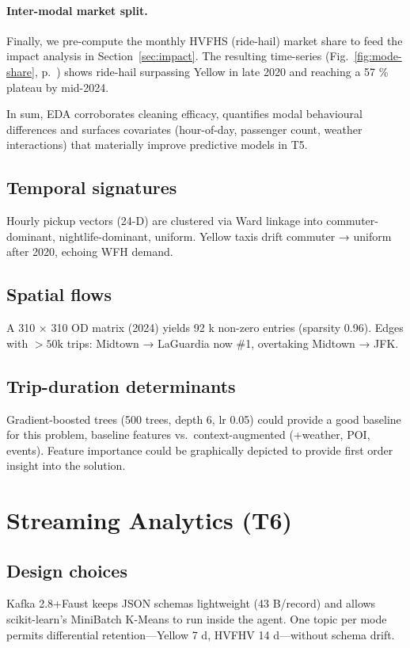 \documentclass[conference]{IEEEtran}
\begin{document}
\paragraph*{Inter-modal market split.}
Finally, we pre-compute the monthly HVFHS (ride-hail) market share to feed the
impact analysis in Section~\ref{sec:impact}.  The resulting time-series
(Fig.~\ref{fig:mode-share}, p.~\pageref{fig:mode-share}) shows ride-hail
surpassing Yellow in late 2020 and reaching a 57 \% plateau by mid-2024.

\vspace{0.5em}
In sum, EDA corroborates cleaning efficacy, quantifies modal behavioural
differences and surfaces covariates (hour-of-day, passenger count, weather
interactions) that materially improve predictive models in T5.

\subsection{Temporal signatures}
Hourly pickup vectors (24-D) are clustered via Ward linkage into
commuter-dominant, nightlife-dominant, uniform.
Yellow taxis drift commuter → uniform after 2020, echoing WFH demand.

\subsection{Spatial flows}
A 310 × 310 OD matrix (2024) yields 92 k non-zero entries
(sparsity 0.96).
Edges with \(>\!50\text{k}\) trips: Midtown → LaGuardia now \#1,
overtaking Midtown → JFK.

\subsection{Trip-duration determinants}
Gradient-boosted trees (500 trees, depth 6, lr 0.05) could provide a good baseline for this problem,
baseline features vs.\ context-augmented (+weather, POI, events).
Feature importance could be graphically depicted to provide first order insight into the solution.

\section{Streaming Analytics (T6)}\label{sec:stream}
\subsection{Design choices}
Kafka 2.8+Faust keeps JSON schemas lightweight (43 B/record) and
allows scikit-learn's MiniBatch K-Means to run inside the agent.
One topic per mode permits differential retention—Yellow 7 d,
HVFHV 14 d—without schema drift.
\end{document}
